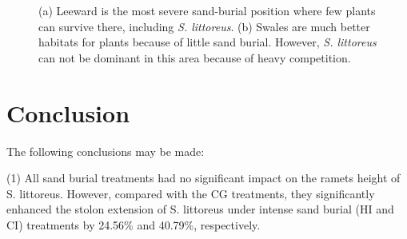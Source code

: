 \documentclass[]{interact}
\theoremstyle{plain}%
\theoremstyle{definition}
\theoremstyle{remark}
\begin{document}
\begin{figure}
  \centering
  \hspace{5pt}
  \caption{(a) Leeward is the most severe sand-burial position where few plants can survive there, including \textit{S. littoreus}. (b) Swales are much better habitats for plants because of little sand burial. However, \textit{S. littoreus} can not be dominant in this area because of heavy competition.} 
  \label{fig:leeward_swale}
\end{figure}

\section{Conclusion}
The following conclusions may be made:

(1) All sand burial treatments had no significant impact on the 
ramets height of S. littoreus. However, compared with the CG treatments, they significantly enhanced the stolon extension of S. littoreus under intense sand burial (HI and CI) treatments by 24.56\% and 40.79\%, respectively.
\end{document}

